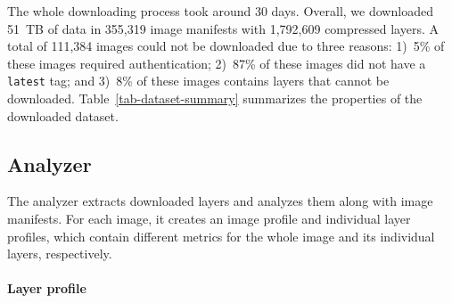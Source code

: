The whole downloading process took around 30 days.
%
Overall, we downloaded 51~TB of data in 355,319 image manifests with 1,792,609
compressed layers.
%
A total of 111,384 images could not be downloaded due to three reasons:
%
1)~5\% of these images required authentication;
2)~87\% of these images did not have a \texttt{latest} tag; and
3)~8\% of these images contains layers that cannot be downloaded.
Table~\ref{tab-dataset-summary} summarizes the properties of the downloaded
dataset.



\subsection{Analyzer}
\label{sec:analyzer}

The analyzer extracts downloaded layers
and analyzes them along with image manifests.
For each image, it creates an image profile and individual layer profiles,
which contain different metrics for the whole image and
its individual layers, respectively.

\paragraph{Layer profile}

